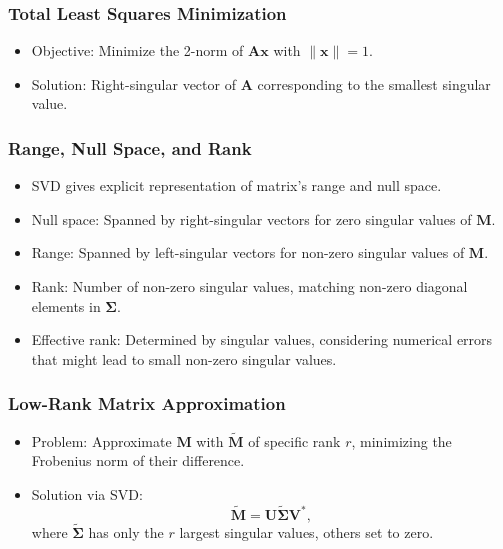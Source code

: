 \documentclass[8pt, a4paper, landscape, includeheadfoot]{extarticle}
\begin{document}
\begin{multicols*}{4}
	\subsubsection{Total Least Squares Minimization}{}
	\begin{itemize}[itemsep=0pt, leftmargin=8pt]
		\item Objective: Minimize the 2-norm of \( \mathbf{A} \mathbf{x} \) with \( \| \mathbf{x} \| = 1 \).
		\item Solution: Right-singular vector of \( \mathbf{A} \) corresponding to the smallest singular value.
	\end{itemize}

	\subsubsection{Range, Null Space, and Rank}{}
	\begin{itemize}[itemsep=0pt, leftmargin=8pt]
		\item SVD gives explicit representation of matrix's range and null space.
		\item Null space: Spanned by right-singular vectors for zero singular values of \( \mathbf{M} \).
		\item Range: Spanned by left-singular vectors for non-zero singular values of \( \mathbf{M} \).
		\item Rank: Number of non-zero singular values, matching non-zero diagonal elements in \( \mathbf{\Sigma} \).
		\item Effective rank: Determined by singular values, considering numerical errors that might lead to small non-zero singular values.
	\end{itemize}

	\subsubsection{Low-Rank Matrix Approximation}{}
	\begin{itemize}[itemsep=0pt, leftmargin=8pt]
		\item Problem: Approximate \( \mathbf{M} \) with \( \tilde{\mathbf{M}} \) of specific rank \( r \), minimizing the Frobenius norm of their difference.
		\item Solution via SVD:
		      \[
			      \tilde{\mathbf{M}} = \mathbf{U} \tilde{\mathbf{\Sigma}} \mathbf{V}^*,
		      \]
		      where \( \tilde{\mathbf{\Sigma}} \) has only the \( r \) largest singular values, others set to zero.
	\end{itemize}


\end{multicols*}
\end{document}
